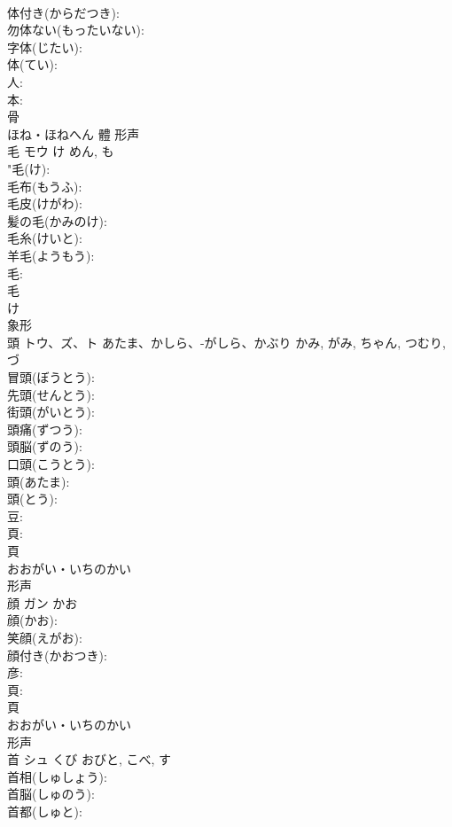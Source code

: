 \documentclass[8pt]{extreport}
\begin{document}
\begin{CJK}{UTF8}{min}
\\	体付き(からだつき): 
\\	勿体ない(もったいない): 
\\	字体(じたい): 
\\	体(てい): 
\\	人: 
\\	本: 
\\	骨	
\\	ほね・ほねへん	體	形声 
\\	毛	モウ	け	めん, も	
\\	"毛(け): 
\\	毛布(もうふ): 
\\	毛皮(けがわ): 
\\	髪の毛(かみのけ): 
\\	毛糸(けいと): 
\\	羊毛(ようもう): 
\\	毛: 
\\	毛	
\\	け	
\\	象形 
\\	頭	トウ、ズ、ト	あたま、かしら、-がしら、かぶり	かみ, がみ, ちゃん, つむり, づ	
\\	冒頭(ぼうとう): 
\\	先頭(せんとう): 
\\	街頭(がいとう): 
\\	頭痛(ずつう): 
\\	頭脳(ずのう): 
\\	口頭(こうとう): 
\\	頭(あたま): 
\\	頭(とう): 
\\	豆: 
\\	頁: 
\\	頁	
\\	おおがい・いちのかい	
\\	形声 
\\	顔	ガン	かお		
\\	顔(かお): 
\\	笑顔(えがお): 
\\	顔付き(かおつき): 
\\	彦: 
\\	頁: 
\\	頁	
\\	おおがい・いちのかい	
\\	形声 
\\	首	シュ	くび	おびと, こべ, す	
\\	首相(しゅしょう): 
\\	首脳(しゅのう): 
\\	首都(しゅと): 

\end{CJK}
\end{document}
